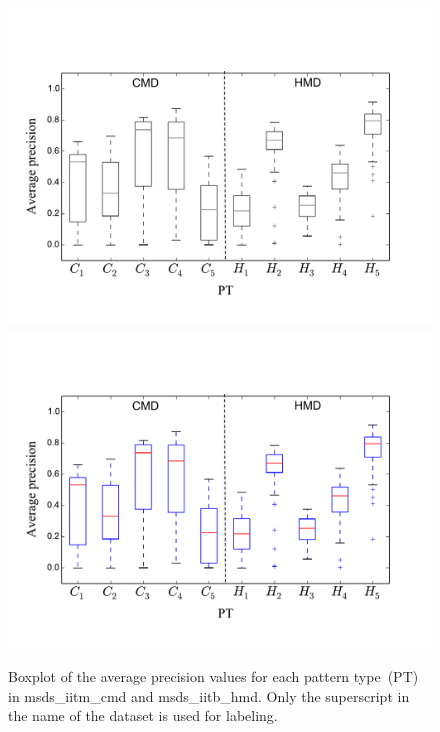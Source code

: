 \begin{figure}
	\begin{center}
		\ifdefined\PRINTVER
			\includegraphics[width=\figSizeEightyFive]{ch06_patterns/figures/SimilarityEvaluation/CMD_HMD_CW_MAP_BW.pdf}
		\else
			\includegraphics[width=\figSizeEightyFive]{ch06_patterns/figures/SimilarityEvaluation/CMD_HMD_CW_MAP.pdf}
		\fi
	\end{center}
	\caption[Boxplot of average precision values for different types of melodic patterns]{Boxplot of the average precision values for each pattern type~(PT) in \acrshort{msds_iitm_cmd} and \acrshort{msds_iitb_hmd}. Only the superscript in the name of the dataset is used for labeling.}
	\label{fig:patterns_similarity_evaluation_results_boxplot}
\end{figure}


